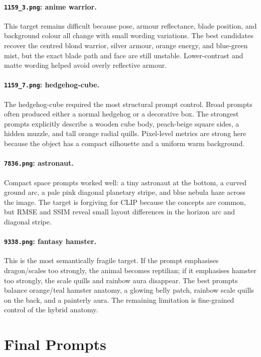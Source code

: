 \documentclass[runningheads]{llncs}
\newcommand{\imgpath}[1]{\texttt{#1}}
\begin{document}
\paragraph{\imgpath{1159\_3.png}: anime warrior.}
This target remains difficult because pose, armour reflectance, blade position, and background colour all change with small wording variations. The best candidates recover the centred blond warrior, silver armour, orange energy, and blue-green mist, but the exact blade path and face are still unstable. Lower-contrast and matte wording helped avoid overly reflective armour.

\paragraph{\imgpath{1159\_7.png}: hedgehog-cube.}
The hedgehog-cube required the most structural prompt control. Broad prompts often produced either a normal hedgehog or a decorative box. The strongest prompts explicitly describe a wooden cube body, peach-beige square sides, a hidden muzzle, and tall orange radial quills. Pixel-level metrics are strong here because the object has a compact silhouette and a uniform warm background.

\paragraph{\imgpath{7836.png}: astronaut.}
Compact space prompts worked well: a tiny astronaut at the bottom, a curved ground arc, a pale pink diagonal planetary stripe, and blue nebula haze across the image. The target is forgiving for CLIP because the concepts are common, but RMSE and SSIM reveal small layout differences in the horizon arc and diagonal stripe.

\paragraph{\imgpath{9338.png}: fantasy hamster.}
This is the most semantically fragile target. If the prompt emphasises dragon/scales too strongly, the animal becomes reptilian; if it emphasises hamster too strongly, the scale quills and rainbow aura disappear. The best prompts balance orange/teal hamster anatomy, a glowing belly patch, rainbow scale quills on the back, and a painterly aura. The remaining limitation is fine-grained control of the hybrid anatomy.

\section{Final Prompts}
\end{document}
